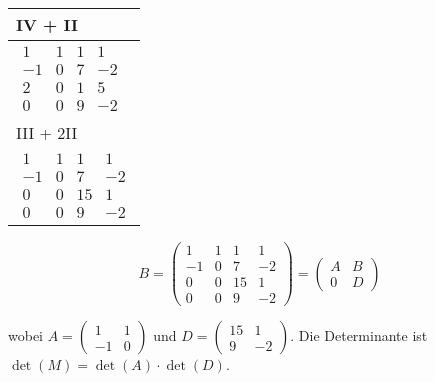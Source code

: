 \begin{longtable}{p{10cm}}
    IV + II                                                                                \\\hline\pagebreak[0]

    $\displaystyle\begin{matrix}
                          1  & 1 & 1 & 1  \\
                          -1 & 0 & 7 & -2 \\
                          2  & 0 & 1 & 5  \\
                          0  & 0 & 9 & -2
                      \end{matrix}$                                                          \\\hline

    III + 2II                                                                              \\\hline\pagebreak[0]

    $\displaystyle\begin{matrix}
                          1  & 1 & 1  & 1  \\
                          -1 & 0 & 7  & -2 \\
                          0  & 0 & 15 & 1  \\
                          0  & 0 & 9  & -2
                      \end{matrix}$                                                         \\\hline

\end{longtable}

\[
    B = \left( \begin{array}{cc|cc}
            1  & 1 & 1  & 1  \\
            -1 & 0 & 7  & -2 \\
            \hline
            0  & 0 & 15 & 1  \\
            0  & 0 & 9  & -2
        \end{array} \right)
    = \begin{pmatrix} A & B \\ 0 & D \end{pmatrix}
\]

wobei $A = \begin{pmatrix} 1 & 1 \\ -1 & 0 \end{pmatrix}$ und $D = \begin{pmatrix} 15 & 1 \\ 9 & -2 \end{pmatrix}$.
Die Determinante ist $\det(M) = \det(A) \cdot \det(D)$.

